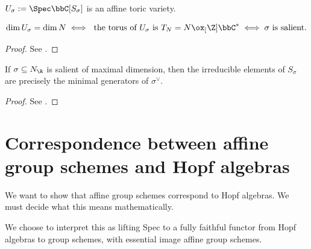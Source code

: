 \begin{definition}
  \label{1-2-18-aff-tor-var-rat-polyhedral-cone}

  $U_\sigma := \Spec \bbC[S_\sigma]$ is an affine toric variety.
\end{definition}


\begin{theorem}
  \label{1-2-18-dim-aff-tor-var-rat-polyhedral-cone}

  \[
    \dim U_\sigma = \dim N \iff \text{ the torus of $U_\sigma$ is } T_N = N \ox_[\Z] \bbC^* \iff \sigma \text{ is salient}.
  \]
\end{theorem}
\begin{proof}

  See \cite{Cox_2011}.
\end{proof}


\begin{proposition}
  \label{1-2-22-irred-dual-lat}

  If $\sigma \subseteq N_\R$ is salient of maximal dimension, then the irreducible elements of $S_\sigma$ are precisely the minimal generators of $\sigma^\vee$.
\end{proposition}
\begin{proof}

  See \cite{Cox_2011}.
\end{proof}


\section{Correspondence between affine group schemes and Hopf algebras}


We want to show that affine group schemes correspond to Hopf algebras.
We must decide what this means mathematically.

We choose to interpret this as lifting Spec to a fully faithful functor
from Hopf algebras to group schemes,
with essential image affine group schemes.


